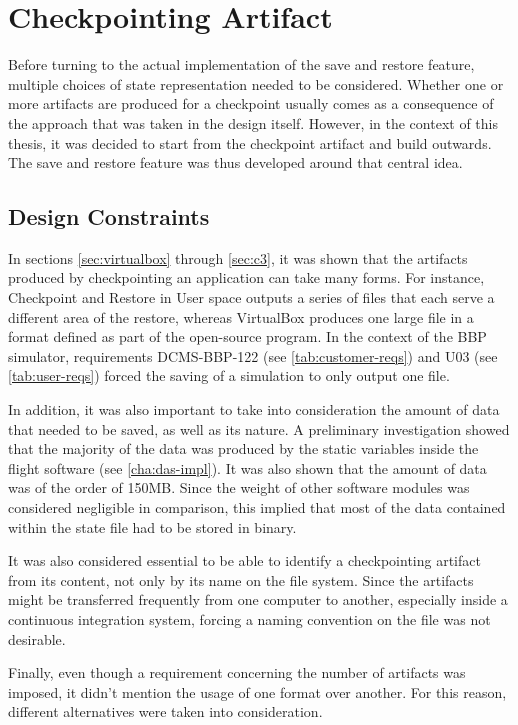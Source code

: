 {
\setlength{\parindent}{2em}
\chapter{Checkpointing Artifact} \label{cha:prod-artifact}
Before turning to the actual implementation of the save and restore feature, multiple choices of state representation needed to be considered. Whether one or more artifacts are produced for a checkpoint usually comes as a consequence of the approach that was taken in the design itself. However, in the context of this thesis, it was decided to start from the checkpoint artifact and build outwards. The save and restore feature was thus developed around that central idea.

\section{Design Constraints}\label{sec:file-constraints}
In sections \ref{sec:virtualbox} through \ref{sec:c3}, it was shown that the artifacts produced by checkpointing an application can take many forms. For instance, Checkpoint and Restore in User space outputs a series of files that each serve a different area of the restore, whereas VirtualBox produces one large file in a format defined as part of the open-source program. In the context of the BBP simulator, requirements DCMS-BBP-122 (see \autoref{tab:customer-reqs}) and U03 (see \autoref{tab:user-reqs}) forced the saving of a simulation to only output one file.

In addition, it was also important to take into consideration the amount of data that needed to be saved, as well as its nature. A preliminary investigation showed that the majority of the data was produced by the static variables inside the flight software (see \autoref{cha:das-impl}). It was also shown that the amount of data was of the order of 150MB. Since the weight of other software modules was considered negligible in comparison, this implied that most of the data contained within the state file had to be stored in binary.

It was also considered essential to be able to identify a checkpointing artifact from its content, not only by its name on the file system. Since the artifacts might be transferred frequently from one computer to another, especially inside a continuous integration system, forcing a naming convention on the file was not desirable.

Finally, even though a requirement concerning the number of artifacts was imposed, it didn't mention the usage of one format over another. For this reason, different alternatives were taken into consideration. 

}
